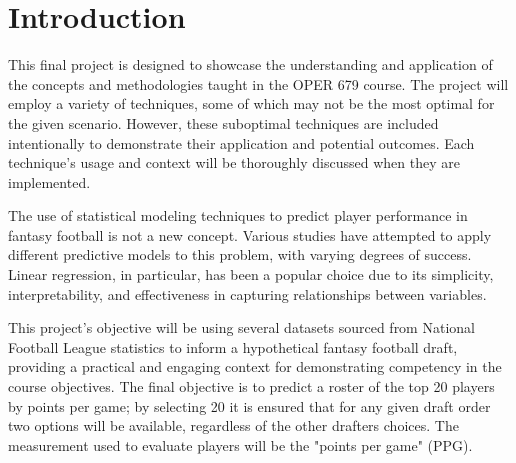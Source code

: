 \chapter{Introduction}
\label{ch:introduction}
\glsresetall

This final project is designed to showcase the understanding and application of the concepts and methodologies taught in the OPER 679 course. The project will employ a variety of techniques, some of which may not be the most optimal for the given scenario. However, these suboptimal techniques are included intentionally to demonstrate their application and potential outcomes. Each technique's usage and context will be thoroughly discussed when they are implemented.

The use of statistical modeling techniques to predict player performance in fantasy football is not a new concept. Various studies have attempted to apply different predictive models to this problem, with varying degrees of success. Linear regression, in particular, has been a popular choice due to its simplicity, interpretability, and effectiveness in capturing relationships between variables.

This project's objective will be using several datasets sourced from National Football League statistics to inform a hypothetical fantasy football draft, providing a practical and engaging context for demonstrating competency in the course objectives. The final objective is to predict a roster of the top 20 players by points per game; by selecting 20 it is ensured that for any given draft order two options will be available, regardless of the other drafters choices. The measurement used to evaluate players will be the "points per game" (PPG).





